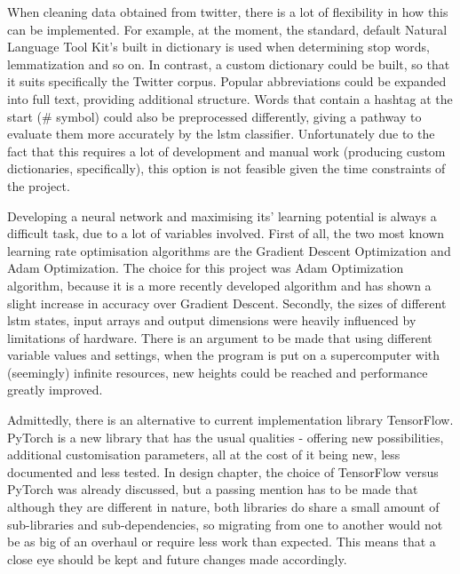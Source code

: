         When cleaning data obtained from twitter, there is a lot of flexibility in how this can be implemented. For example, at the moment, the standard, default Natural Language Tool Kit's built in dictionary is used when determining stop words, lemmatization and so on. In contrast, a custom dictionary could be built, so that it suits specifically the Twitter corpus. Popular abbreviations could be expanded into full text, providing additional structure. Words that contain a hashtag at the start (\# symbol) could also be preprocessed differently, giving a pathway to evaluate them more accurately by the \gls{lstm} classifier. Unfortunately due to the fact that this requires a lot of development and manual work (producing custom dictionaries, specifically), this option is not feasible given the time constraints of the project.
        
        Developing a neural network and maximising its' learning potential is always a difficult task, due to a lot of variables involved. First of all, the two most known learning rate optimisation algorithms are the Gradient Descent Optimization and Adam Optimization. The choice for this project was Adam Optimization algorithm, because it is a more recently developed algorithm and has shown a slight increase in accuracy over Gradient Descent. Secondly, the sizes of different \gls{lstm} states, input arrays and output dimensions were heavily influenced by limitations of hardware. There is an argument to be made that using different variable values and settings, when the program is put on a supercomputer with (seemingly) infinite resources, new heights could be reached and performance greatly improved.
        
        Admittedly, there is an alternative to current implementation library TensorFlow. PyTorch is a new library that has the usual qualities - offering new possibilities, additional customisation parameters, all at the cost of it being new, less documented and less tested. In design chapter, the choice of TensorFlow versus PyTorch was already discussed, but a passing mention has to be made that although they are different in nature, both libraries do share a small amount of sub-libraries and sub-dependencies, so migrating from one to another would not be as big of an overhaul or require less work than expected. This means that a close eye should be kept and future changes made accordingly.
        
